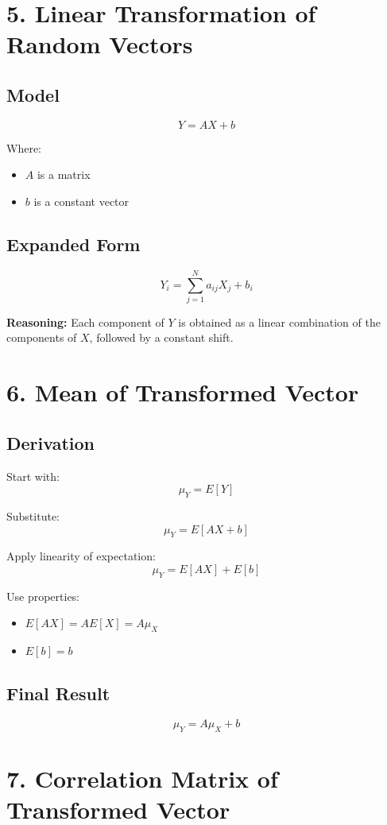 \documentclass{article}
\begin{document}
\section*{5. Linear Transformation of Random Vectors}

\subsection*{Model}
\[
Y = AX + b
\]

Where:
\begin{itemize}
\item $A$ is a matrix
\item $b$ is a constant vector
\end{itemize}

\subsection*{Expanded Form}
\[
Y_i = \sum_{j=1}^{N} a_{ij} X_j + b_i
\]

\textbf{Reasoning:}  
Each component of $Y$ is obtained as a linear combination of the components of $X$, followed by a constant shift.

\section*{6. Mean of Transformed Vector}

\subsection*{Derivation}

Start with:
\[
\mu_Y = E[Y]
\]

Substitute:
\[
\mu_Y = E[AX + b]
\]

Apply linearity of expectation:
\[
\mu_Y = E[AX] + E[b]
\]

Use properties:
\begin{itemize}
\item $E[AX] = A E[X] = A\mu_X$
\item $E[b] = b$
\end{itemize}

\subsection*{Final Result}
\[
\mu_Y = A\mu_X + b
\]

\section*{7. Correlation Matrix of Transformed Vector}
\end{document}
